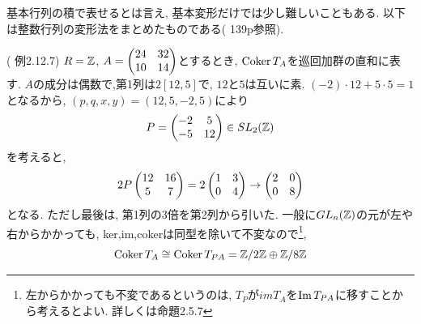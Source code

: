 基本行列の積で表せるとは言え, 基本変形だけでは少し難しいこともある. 以下は整数行列の変形法をまとめたものである(\cite{aoyukie} 139p参照).

\begin{eg} (\cite{aoyukie} 例2.12.7)
$R=\mathbb{Z}$, $A=\begin{pmatrix} 24 & 32 \\ 10 & 14 \end{pmatrix}$とするとき, $\mathrm{Coker}\,T_{A}$を巡回加群の直和に表す. $A$の成分は偶数で,第1列は$2[12,5]$で, $12$と$5$は互いに素. $(-2)\cdot 12 + 5\cdot 5 = 1$となるから, $(p,q,x,y) = (12,5,-2,5)$により
\[P = \begin{pmatrix} -2 & 5 \\ -5 & 12 \end{pmatrix} \in SL_{2}(\mathbb{Z})\]
を考えると,
\[2P \begin{pmatrix} 12 & 16 \\ 5 & 7 \end{pmatrix} = 2 \begin{pmatrix} 1 & 3 \\ 0 & 4 \end{pmatrix}\to \begin{pmatrix} 2 & 0 \\ 0 & 8 \end{pmatrix}\]
となる. ただし最後は, 第1列の3倍を第2列から引いた. 一般に$GL_{n}(\mathbb{Z})$の元が左や右からかかっても, ker,im,cokerは同型を除いて不変なので\footnote{左からかかっても不変であるというのは, $T_P$が$im{T_A}$を$\mathrm{Im}\,T_{PA}$に移すことから考えるとよい. 詳しくは\cite{aoyukie}命題2.5.7},
\[\mathrm{Coker}\,T_A \cong \mathrm{Coker}\,T_{PA} = \mathbb{Z}/2\mathbb{Z} \oplus \mathbb{Z}/8\mathbb{Z}\]
\end{eg}

